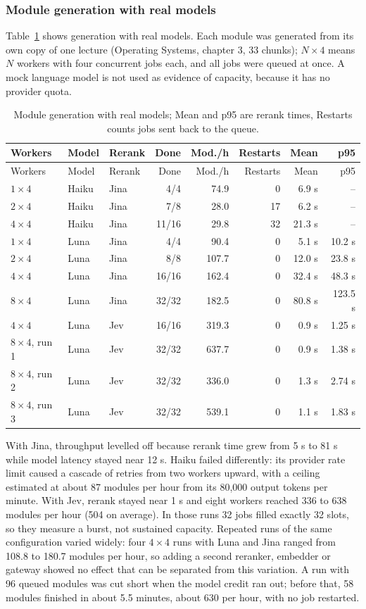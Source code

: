 \subsubsection{Module generation with real models}
Table~\ref{tab:gen-scale} shows generation with real models. Each module was generated from its own copy of one lecture (Operating Systems, chapter 3, 33 chunks); $N\times4$ means $N$ workers with four concurrent jobs each, and all jobs were queued at once. A mock language model is not used as evidence of capacity, because it has no provider quota.
\begin{longtable}{|l|l|l|r|r|r|r|r|}\caption{Module generation with real models; Mean and p95 are rerank times, Restarts counts jobs sent back to the queue.}\label{tab:gen-scale}\\\hline
Workers & Model & Rerank & Done & Mod./h & Restarts & Mean & p95\\\hline\endfirsthead
\hline Workers & Model & Rerank & Done & Mod./h & Restarts & Mean & p95\\\hline\endhead
$1\times4$ & Haiku & Jina & 4/4 & 74.9 & 0 & 6.9 s & --\\\hline
$2\times4$ & Haiku & Jina & 7/8 & 28.0 & 17 & 6.2 s & --\\\hline
$4\times4$ & Haiku & Jina & 11/16 & 29.8 & 32 & 21.3 s & --\\\hline
$1\times4$ & Luna & Jina & 4/4 & 90.4 & 0 & 5.1 s & 10.2 s\\\hline
$2\times4$ & Luna & Jina & 8/8 & 107.7 & 0 & 12.0 s & 23.8 s\\\hline
$4\times4$ & Luna & Jina & 16/16 & 162.4 & 0 & 32.4 s & 48.3 s\\\hline
$8\times4$ & Luna & Jina & 32/32 & 182.5 & 0 & 80.8 s & 123.5 s\\\hline
$4\times4$ & Luna & Jev & 16/16 & 319.3 & 0 & 0.9 s & 1.25 s\\\hline
$8\times4$, run 1 & Luna & Jev & 32/32 & 637.7 & 0 & 0.9 s & 1.38 s\\\hline
$8\times4$, run 2 & Luna & Jev & 32/32 & 336.0 & 0 & 1.3 s & 2.74 s\\\hline
$8\times4$, run 3 & Luna & Jev & 32/32 & 539.1 & 0 & 1.1 s & 1.83 s\\\hline
\end{longtable}
With Jina, throughput levelled off because rerank time grew from 5 s to 81 s while model latency stayed near 12 s. Haiku failed differently: its provider rate limit caused a cascade of retries from two workers upward, with a ceiling estimated at about 87 modules per hour from its 80,000 output tokens per minute. With Jev, rerank stayed near 1 s and eight workers reached 336 to 638 modules per hour (504 on average). In those runs 32 jobs filled exactly 32 slots, so they measure a burst, not sustained capacity. Repeated runs of the same configuration varied widely: four $4\times4$ runs with Luna and Jina ranged from 108.8 to 180.7 modules per hour, so adding a second reranker, embedder or gateway showed no effect that can be separated from this variation. A run with 96 queued modules was cut short when the model credit ran out; before that, 58 modules finished in about 5.5 minutes, about 630 per hour, with no job restarted.
